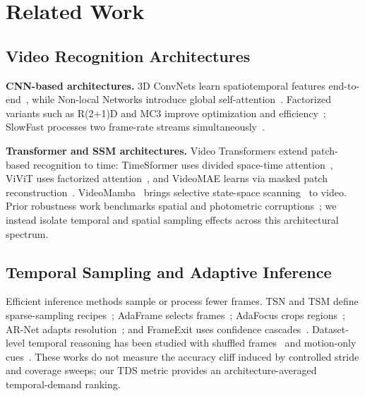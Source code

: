 \documentclass[runningheads]{llncs}
\newcommand{\TDS}{\textsc{TDS}}
\begin{document}
\section{Related Work}
\label{sec:related}

\subsection{Video Recognition Architectures}

\textbf{CNN-based architectures.} 3D ConvNets learn spatiotemporal features end-to-end~\cite{tran2015c3d,carreira2017i3d}, while Non-local Networks introduce global self-attention~\cite{wang2018nonlocal}. Factorized variants such as R(2+1)D and MC3 improve optimization and efficiency~\cite{tran2018r2plus1d,tran2019video}; SlowFast processes two frame-rate streams simultaneously~\cite{feichtenhofer2019slowfast}.

\textbf{Transformer and SSM architectures.} Video Transformers extend patch-based recognition to time: TimeSformer uses divided space-time attention~\cite{bertasius2021timesformer}, ViViT uses factorized attention~\cite{arnab2021vivit}, and VideoMAE learns via masked patch reconstruction~\cite{tong2022videomae,wang2023videomaev2}. VideoMamba~\cite{li2024videomamba} brings selective state-space scanning~\cite{gu2023mamba,dao2024mamba2} to video. Prior robustness work benchmarks spatial and photometric corruptions~\cite{schiappa2023robustness}; we instead isolate temporal and spatial sampling effects across this architectural spectrum.

\subsection{Temporal Sampling and Adaptive Inference}

Efficient inference methods sample or process fewer frames. TSN and TSM define sparse-sampling recipes~\cite{wang2016tsn,lin2019tsm}; AdaFrame selects frames~\cite{wu2019adaframe}; AdaFocus crops regions~\cite{wang2021adafocus}; AR-Net adapts resolution~\cite{meng2020arnet}; and FrameExit uses confidence cascades~\cite{ghodrati2021frameexit}. Dataset-level temporal reasoning has been studied with shuffled frames~\cite{huang2018makes} and motion-only cues~\cite{sevilla2021only}. These works do not measure the accuracy cliff induced by controlled stride and coverage sweeps; our \TDS{} metric provides an architecture-averaged temporal-demand ranking.
\end{document}
